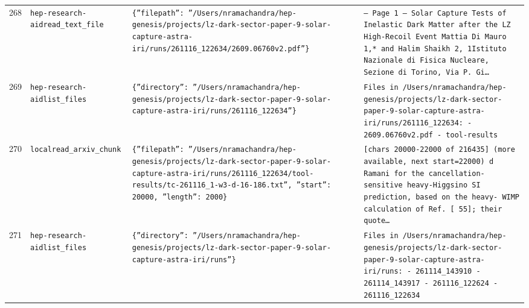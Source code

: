 \documentclass[11pt,a4paper]{article}
\begin{document}
\begin{longtable}{@{}p{}p{}p{}p{}@{}}
268 & \texttt{hep-research-aid}\newline\texttt{read\_\allowbreak{}text\_\allowbreak{}file} & \texttt{\{''filepath'':\allowbreak{} ''/\allowbreak{}Users/\allowbreak{}nramachandra/\allowbreak{}hep-genesis/\allowbreak{}projects/\allowbreak{}lz-dark-sector-paper-9-solar-capture-astra-iri/\allowbreak{}runs/\allowbreak{}261116\_\allowbreak{}122634/\allowbreak{}2609.06760v2.pdf''\}\allowbreak{}} & \texttt{--- Page 1 --- Solar Capture Tests of Inelastic Dark Matter after the LZ High-Recoil Event Mattia Di Mauro 1,\allowbreak{}* and Halim Shaikh 2,\allowbreak{}\dag{}\allowbreak{} 1Istituto Nazionale di Fisica Nucleare,\allowbreak{} Sezione di Torino,\allowbreak{} Via P. Gi\ldots{}\allowbreak{}} \\
269 & \texttt{hep-research-aid}\newline\texttt{list\_\allowbreak{}files} & \texttt{\{''directory'':\allowbreak{} ''/\allowbreak{}Users/\allowbreak{}nramachandra/\allowbreak{}hep-genesis/\allowbreak{}projects/\allowbreak{}lz-dark-sector-paper-9-solar-capture-astra-iri/\allowbreak{}runs/\allowbreak{}261116\_\allowbreak{}122634''\}\allowbreak{}} & \texttt{Files in /\allowbreak{}Users/\allowbreak{}nramachandra/\allowbreak{}hep-genesis/\allowbreak{}projects/\allowbreak{}lz-dark-sector-paper-9-solar-capture-astra-iri/\allowbreak{}runs/\allowbreak{}261116\_\allowbreak{}122634:\allowbreak{}   - 2609.06760v2.pdf   - tool-results} \\
270 & \texttt{local}\newline\texttt{read\_\allowbreak{}arxiv\_\allowbreak{}chunk} & \texttt{\{''filepath'':\allowbreak{} ''/\allowbreak{}Users/\allowbreak{}nramachandra/\allowbreak{}hep-genesis/\allowbreak{}projects/\allowbreak{}lz-dark-sector-paper-9-solar-capture-astra-iri/\allowbreak{}runs/\allowbreak{}261116\_\allowbreak{}122634/\allowbreak{}tool-results/\allowbreak{}tc-261116\_\allowbreak{}1-w3-d-16-186.txt'',\allowbreak{} ''start'':\allowbreak{} 20000,\allowbreak{} ''length'':\allowbreak{} 2000\}\allowbreak{}} & \texttt{[chars 20000-22000 of 216435]\allowbreak{} (more available,\allowbreak{} next start=\allowbreak{}22000)\allowbreak{}  d Ramani for the cancellation- sensitive heavy-Higgsino SI prediction,\allowbreak{} based on the heavy- WIMP calculation of Ref. [ 55]\allowbreak{};\allowbreak{} their quote\ldots{}\allowbreak{}} \\
271 & \texttt{hep-research-aid}\newline\texttt{list\_\allowbreak{}files} & \texttt{\{''directory'':\allowbreak{} ''/\allowbreak{}Users/\allowbreak{}nramachandra/\allowbreak{}hep-genesis/\allowbreak{}projects/\allowbreak{}lz-dark-sector-paper-9-solar-capture-astra-iri/\allowbreak{}runs''\}\allowbreak{}} & \texttt{Files in /\allowbreak{}Users/\allowbreak{}nramachandra/\allowbreak{}hep-genesis/\allowbreak{}projects/\allowbreak{}lz-dark-sector-paper-9-solar-capture-astra-iri/\allowbreak{}runs:\allowbreak{}   - 261114\_\allowbreak{}143910   - 261114\_\allowbreak{}143917   - 261116\_\allowbreak{}122624   - 261116\_\allowbreak{}122634} \\

\end{longtable}
\end{document}
